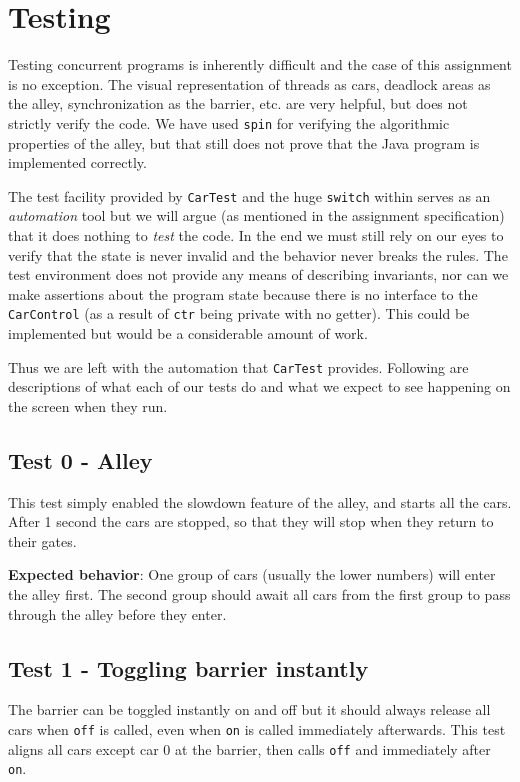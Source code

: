 \section{Testing}

Testing concurrent programs is inherently difficult and the case of this assignment is no exception. The visual representation of threads as cars, deadlock areas as the alley, synchronization as the barrier, etc. are very helpful, but does not strictly verify the code. We have used \texttt{spin} for verifying the algorithmic properties of the alley, but that still does not prove that the Java program is implemented correctly.

The test facility provided by \texttt{CarTest} and the huge \texttt{switch} within serves as an \emph{automation} tool but we will argue (as mentioned in the assignment specification) that it does nothing to \emph{test} the code. In the end we must still rely on our eyes to verify that the state is never invalid and the behavior never breaks the rules. The test environment does not provide any means of describing invariants, nor can we make assertions about the program state because there is no interface to the \texttt{CarControl} (as a result of \texttt{ctr} being private with no getter). This could be implemented but would be a considerable amount of work.

Thus we are left with the automation that \texttt{CarTest} provides. Following are descriptions of what each of our tests do and what we expect to see happening on the screen when they run.

\subsection{Test 0 - Alley}
This test simply enabled the slowdown feature of the alley, and starts all the cars. After 1 second the cars are stopped, so that they will stop when they return to their gates.

\textbf{Expected behavior}: One group of cars (usually the lower numbers) will enter the alley first. The second group should await all cars from the first group to pass through the alley before they enter.

\subsection{Test 1 - Toggling barrier instantly}
The barrier can be toggled instantly on and off but it should always release all cars when \texttt{off} is called, even when \texttt{on} is called immediately afterwards. This test aligns all cars except car 0 at the barrier, then calls \texttt{off} and immediately after \texttt{on}.

